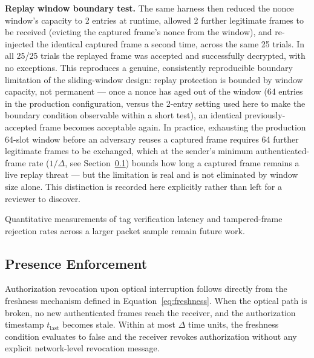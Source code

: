 \documentclass[conference]{IEEEtran}
\begin{document}
\textbf{Replay window boundary test.} The same harness then reduced the nonce window's capacity to 2 entries at runtime, allowed 2 further legitimate frames to be received (evicting the captured frame's nonce from the window), and re-injected the identical captured frame a second time, across the same 25 trials. In all 25/25 trials the replayed frame was accepted and successfully decrypted, with no exceptions. This reproduces a genuine, consistently reproducible boundary limitation of the sliding-window design: replay protection is bounded by window capacity, not permanent — once a nonce has aged out of the window (64 entries in the production configuration, versus the 2-entry setting used here to make the boundary condition observable within a short test), an identical previously-accepted frame becomes acceptable again. In practice, exhausting the production 64-slot window before an adversary reuses a captured frame requires 64 further legitimate frames to be exchanged, which at the sender's minimum authenticated-frame rate ($1/\Delta$, see Section~\ref{sec:presence-enforcement}) bounds how long a captured frame remains a live replay threat — but the limitation is real and is not eliminated by window size alone. This distinction is recorded here explicitly rather than left for a reviewer to discover.

Quantitative measurements of tag verification latency and tampered-frame rejection rates across a larger packet sample remain future work.

\subsection{Presence Enforcement}
\label{sec:presence-enforcement}

Authorization revocation upon optical interruption follows directly from the freshness mechanism defined in Equation~\eqref{eq:freshness}. When the optical path is broken, no new authenticated frames reach the receiver, and the authorization timestamp $t_{\text{last}}$ becomes stale. Within at most $\Delta$ time units, the freshness condition evaluates to false and the receiver revokes authorization without any explicit network-level revocation message.
\end{document}
